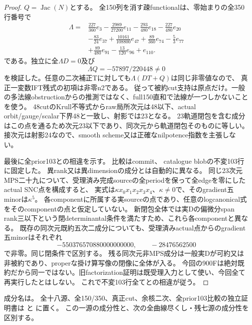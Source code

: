 \documentclass[a4paper,11pt]{ltjsarticle}
\theoremstyle{definition}
\begin{document}
\begin{proof}
$Q=\operatorname{Jac}(N)$とする。
全150列を消す疎functionalは、零始まりの全350行番号で
\[
\begin{aligned}
 \Lambda={}&\frac{227}{360}e_3-\frac{2989}{27200}e_{11}-\frac{293}{480}e_{18}-\frac{227}{480}e_{20}\\
 &-\frac{83}{24}e_{37}+\frac{10161}{108800}e_{47}+\frac{89}{360}e_{74}-\frac53e_{77}\\
 &+\frac{89}{480}e_{91}-\frac{13}{120}e_{96}+e_{110}.
\end{aligned}
\]
である。独立に全$\Lambda D=0$及び
\[
 \Lambda Q=-57897/220448\ne0
\]
を検証した。任意の二次補正Tに対しても$\Lambda(DT+Q)$は同じ非零値なので、
真正一変数IFT残式の初項は非零n2である。
従って被約cut支持は原点だけ。一般の多法線obstructionからの推測ではなく、full150直和で法線が一つしかないことを使う。
48cutのKrull不等式からraw局所次元は48以下、actual orbit/gauge/scalar下界48と一致し、射影では23となる。
23軌道閉包を含む成分はこの点を通るため次元23以下であり、同次元から軌道閉包そのものに等しい。
接次元は射影24なので、smooth scheme又は正確なnilpotence指数を主張しない。

最後に全prior103との相違を示す。
比較はcommit、
catalogue blobの不変103行に固定した。
異rank又は異dimensionの成分とは自動的に異なる。
同じ23次元MPS二十九について、受理済み完成sourceの全periodを保って全edgeを零にしたactual SNC点を構成すると、
実式は$\kappa x_0x_1x_2x_3x_4$、$\kappa\ne0$で、そのgradient五minorは$\kappa^5$。
各componentに所属する実sourceの点であり、任意のlogcanonical式をそのcomponentの点と仮定していない。
新閉包全体では実Dの偏微分span rank三以下という閉determinantal条件を満たすため、これら各componentと異なる。
既存の同次元既約五次二成分についても、受理済みactual点からのgradient五minorはそれぞれ
\[
 -550376570880000000000,\qquad-28476562500
\]
で非零。同じ閉条件で区別する。
残る同次元非MPS成分は一般実Dが可約又は非被約であり、properな掛け算写像の閉像に全体が入る。
今回の900Fは絶対既約だから同一ではない。旧factorization証明は既受理入力として使い、今回全て再実行したとはしない。
これで不変103行全てとの相違が従う。
\end{proof}
成分名は。
全十八源、全150/350、真正cut、余核二次、全prior103比較の独立証明書は
と
に置く。
この一源の成分性と、次の全曲線尽くし・残七源の成分性を区別する。
\end{document}
